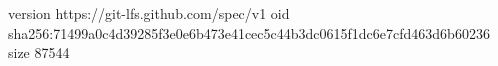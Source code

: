 version https://git-lfs.github.com/spec/v1
oid sha256:71499a0c4d39285f3e0e6b473e41cec5c44b3dc0615f1dc6e7cfd463d6b60236
size 87544
